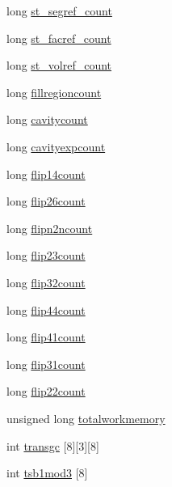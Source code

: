\begin{DoxyCompactItemize}
\item 
long \hyperlink{classtetgenmesh_ac2b943e3323faea3af2521fede229024}{st\+\_\+segref\+\_\+count}
\item 
long \hyperlink{classtetgenmesh_aa6a2b877259f953e10e48bfa4788ef83}{st\+\_\+facref\+\_\+count}
\item 
long \hyperlink{classtetgenmesh_afa7b63c64990d773c22700fd9022bbdd}{st\+\_\+volref\+\_\+count}
\item 
long \hyperlink{classtetgenmesh_a0a8e70333a9912cb0e212bc9d7ec648f}{fillregioncount}
\item 
long \hyperlink{classtetgenmesh_af6bc7f6e64840197bc176a96da325c5c}{cavitycount}
\item 
long \hyperlink{classtetgenmesh_ac1011e5e52346d8829d4be2d370054eb}{cavityexpcount}
\item 
long \hyperlink{classtetgenmesh_adb10987252049a6ea2f1959a5f0f2c50}{flip14count}
\item 
long \hyperlink{classtetgenmesh_a5afc9b75a5a2418f795ff0ea13793f74}{flip26count}
\item 
long \hyperlink{classtetgenmesh_a7936b404bc33e830d0a7f80737f3fdf8}{flipn2ncount}
\item 
long \hyperlink{classtetgenmesh_a3a939ba7f8ecfe66e9c7889126df3c92}{flip23count}
\item 
long \hyperlink{classtetgenmesh_acbddc46c3d6f1a3c9cc160cd39ba674f}{flip32count}
\item 
long \hyperlink{classtetgenmesh_a84660f45542f2f8c6609fceb8ad00615}{flip44count}
\item 
long \hyperlink{classtetgenmesh_accf2261a6d043618bfbb7af3368eae51}{flip41count}
\item 
long \hyperlink{classtetgenmesh_a1970580330b0ef8b71a6afb16a255a50}{flip31count}
\item 
long \hyperlink{classtetgenmesh_a3d8ebbb8bbacdd0d1cfc899cf40caab3}{flip22count}
\item 
unsigned long \hyperlink{classtetgenmesh_a67341ca5f2c0ece12052d62316f99363}{totalworkmemory}
\item 
int \hyperlink{classtetgenmesh_a606af36503a05864a66eed7887031f92}{transgc} \mbox{[}8\mbox{]}\mbox{[}3\mbox{]}\mbox{[}8\mbox{]}
\item 
int \hyperlink{classtetgenmesh_abcdcec3f841610fe91a0160b4e3a838e}{tsb1mod3} \mbox{[}8\mbox{]}
\end{DoxyCompactItemize}
